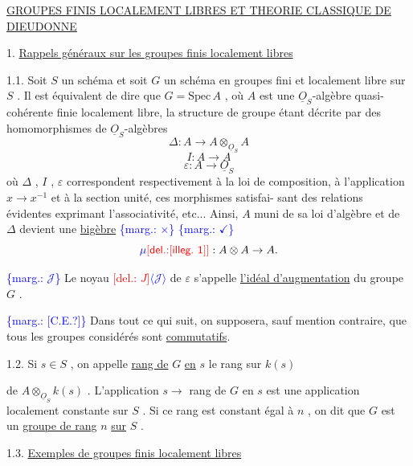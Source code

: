 \documentclass[11pt]{article}
\newcommand{\scanpage}[1]{\par\bigskip\noindent{\small\sffamily[scan #1]}\par}
\newcommand{\mspage}[1]{{\small\sffamily[p.\,#1]}}
\newcommand{\hand}[1]{\textcolor{blue}{#1}}
\newcommand{\inserted}[2][]{\textcolor{blue}{$\langle$#2$\rangle$}}
\newcommand{\margin}[1]{\textcolor{blue}{\{\textsf{marg.:} #1\}}}
\newcommand{\deleted}[1]{\textcolor{red}{[\textsf{del.:} #1]}}
\newcommand{\uline}[1]{\underline{#1}}
\newcommand{\unsure}[1]{[#1?]}
\newcommand{\illegible}[1]{[\textsf{illeg.\ #1}]}
\begin{document}
\uline{GROUPES FINIS LOCALEMENT LIBRES ET THEORIE CLASSIQUE DE DIEUDONNE}

1. \uline{Rappels généraux sur les groupes finis localement libres}

1.1. Soit $S$ un schéma et soit $G$ un schéma en groupes fini et
localement libre sur $S$ . Il est équivalent de dire que $G = \mathrm{Spec}\, A$ ,
où $A$ est une $\underline{O}_S$-algèbre quasi-cohérente finie localement libre, la
structure de groupe étant décrite par des homomorphismes de $\underline{O}_S$-algèbres
\[ \Delta : A \to A \otimes_{\underline{O}_S} A \]
\[ I : A \to A \]
\[ \varepsilon : A \to \underline{O}_S \]
où $\Delta$ , $I$ , $\varepsilon$ correspondent respectivement à la loi de composition, à
l'application $x \to x^{-1}$ et à la section unité, ces morphismes satisfai-%
sant des relations évidentes exprimant l'associativité, etc... Ainsi, $A$
muni de sa loi d'algèbre et de $\Delta$ devient une \uline{bigèbre}
\margin{$\times$} \margin{$\checkmark$}
\[ \hand{\mu}\deleted{\illegible{1}} : A \otimes A \to A . \]

\margin{\hand{$\mathcal{J}$}} Le noyau \deleted{$J$}\inserted{$\mathcal{J}$} de $\varepsilon$ s'appelle \uline{l'idéal d'augmentation} du groupe $G$ .

\margin{\unsure{C.E.}} Dans tout ce qui suit, on supposera, sauf mention contraire,
que tous les groupes considérés sont \uline{commutatifs}.

1.2. Si $s \in S$ , on appelle \uline{rang de} $G$ \uline{en} $s$ le rang sur $k(s)$

\mspage{\hand{29}}

\clearpage
\scanpage{129/30}
\mspage{\hand{II.2}}

de $A \otimes_{\underline{O}_S} k(s)$ . L'application $s \to$ rang de $G$ en $s$ est une application
localement constante sur $S$ . Si ce rang est constant égal à
$n$ , on dit que $G$ est un \uline{groupe de rang} $n$ \uline{sur} $S$ .

1.3. \uline{Exemples de groupes finis localement libres}
\end{document}
